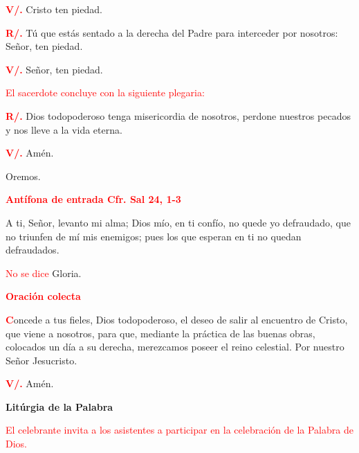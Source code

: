 \documentclass[12pt, letterpaper]{report}
\begin{document}
\noindent
\Large {\bfseries \textcolor{red}{V/.}} \hspace{1cm} Cristo ten piedad.

\noindent
\Large {\bfseries \textcolor{red}{R/.}} \hspace{1cm} T\'u que est\'as sentado a la derecha del Padre para interceder por nosotros: Se\~nor, ten piedad.

\noindent
{\bfseries \textcolor{red}{V/.}} \hspace{1cm} Se\~nor, ten piedad. 

\large {\textcolor{red}{El sacerdote concluye con la siguiente plegaria:}} 

\noindent
\Large {\bfseries \textcolor{red}{R/.}} \hspace{1cm} Dios todopoderoso tenga misericordia de nosotros, perdone nuestros pecados y nos lleve a la vida eterna.

\noindent
\Large {\bfseries \textcolor{red}{V/.}} \hspace{1cm} Am\'en.

\noindent
\Large {Oremos.}

\large {\bfseries \textcolor{red}{Ant\'ifona de entrada \hspace{1cm} Cfr. Sal 24, 1-3} }

\noindent
\Large {A ti, Se\~nor, levanto mi alma; Dios m\'io, en ti conf\'io, no quede yo defraudado, que no triunfen de m\'i mis enemigos; pues los que esperan en ti no quedan defraudados.}

\large {\textcolor{red}{No se dice} Gloria.}

\large {\bfseries \textcolor{red}{Oraci\'on colecta}}

\lettrine[lines=1]{\bfseries \textcolor{red}{C}}{}\Large {oncede a tus fieles, Dios todopoderoso, el deseo de salir al encuentro de Cristo, que viene a nosotros, para que, mediante la pr\'actica de las buenas obras, colocados un d\'ia a su derecha, merezcamos poseer el reino celestial. Por nuestro Se\~nor Jesucristo.}

\noindent
\Large {\bfseries \textcolor{red}{V/.}} \hspace{1cm} Am\'en.

\begin{center}
\Huge {\bfseries Lit\'urgia de la Palabra}
\end{center}

\large {\textcolor{red}{El celebrante invita a los asistentes a participar en la celebraci\'on de la Palabra de Dios.}} 
\end{document}
